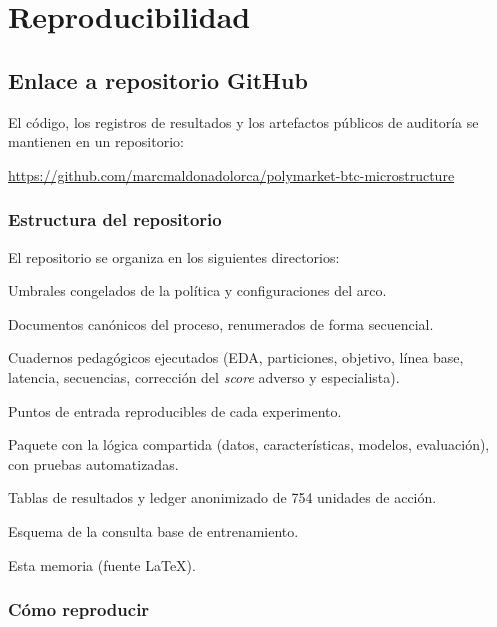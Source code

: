 %
\chapter{Reproducibilidad}
\label{ch::reproducibilidad}

\section{Enlace a repositorio GitHub}

El código, los registros de resultados y los artefactos públicos de auditoría se mantienen en
un repositorio:

\begin{center}
\url{https://github.com/marcmaldonadolorca/polymarket-btc-microstructure}
\end{center}

\subsection{Estructura del repositorio}

El repositorio se organiza en los siguientes directorios:

\begin{description}[align=right,labelwidth=2.6cm]
\item [\texttt{config/}] Umbrales congelados de la política y configuraciones del arco.
\item [\texttt{docs/}] Documentos canónicos del proceso, renumerados de forma secuencial.
\item [\texttt{notebooks/}] Cuadernos pedagógicos ejecutados (EDA, particiones, objetivo,
línea base, latencia, secuencias, corrección del \emph{score} adverso y especialista).
\item [\texttt{scripts/}] Puntos de entrada reproducibles de cada experimento.
\item [\texttt{src/}] Paquete con la lógica compartida (datos, características, modelos,
evaluación), con pruebas automatizadas.
\item [\texttt{results/}] Tablas de resultados y ledger anonimizado de 754 unidades de acción.
\item [\texttt{sql/}] Esquema de la consulta base de entrenamiento.
\item [\texttt{reports/}] Esta memoria (fuente LaTeX).
\end{description}

\subsection{Cómo reproducir}

